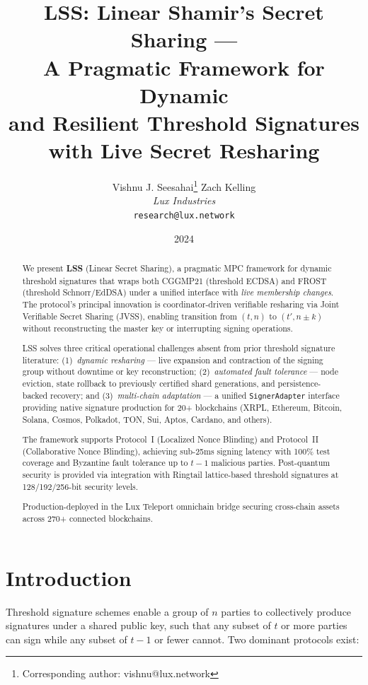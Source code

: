 \documentclass[11pt]{article}
\title{LSS: Linear Shamir's Secret Sharing ---\\A Pragmatic Framework for Dynamic\\and Resilient Threshold Signatures\\with Live Secret Resharing}
\author{
Vishnu J. Seesahai\thanks{Corresponding author: vishnu@lux.network}
\quad
Zach Kelling\\
\textit{Lux Industries}\\
\texttt{research@lux.network}
}
\date{2024}
\begin{document}
\luxcoverpage

\begin{abstract}
We present \textbf{LSS} (Linear Secret Sharing), a pragmatic MPC framework for dynamic threshold signatures that wraps both CGGMP21 (threshold ECDSA) and FROST (threshold Schnorr/EdDSA) under a unified interface with \emph{live membership changes}. The protocol's principal innovation is coordinator-driven verifiable resharing via Joint Verifiable Secret Sharing (JVSS), enabling transition from $(t, n)$ to $(t', n \pm k)$ without reconstructing the master key or interrupting signing operations.

LSS solves three critical operational challenges absent from prior threshold signature literature:
(1)~\emph{dynamic resharing} --- live expansion and contraction of the signing group without downtime or key reconstruction;
(2)~\emph{automated fault tolerance} --- node eviction, state rollback to previously certified shard generations, and persistence-backed recovery; and
(3)~\emph{multi-chain adaptation} --- a unified \texttt{SignerAdapter} interface providing native signature production for 20+ blockchains (XRPL, Ethereum, Bitcoin, Solana, Cosmos, Polkadot, TON, Sui, Aptos, Cardano, and others).

The framework supports Protocol~I (Localized Nonce Blinding) and Protocol~II (Collaborative Nonce Blinding), achieving sub-25ms signing latency with 100\% test coverage and Byzantine fault tolerance up to $t - 1$ malicious parties. Post-quantum security is provided via integration with Ringtail lattice-based threshold signatures at 128/192/256-bit security levels.

Production-deployed in the Lux Teleport omnichain bridge securing cross-chain assets across 270+ connected blockchains.
\end{abstract}

\tableofcontents

\section{Introduction}

Threshold signature schemes enable a group of $n$ parties to collectively produce signatures under a shared public key, such that any subset of $t$ or more parties can sign while any subset of $t - 1$ or fewer cannot. Two dominant protocols exist:
\end{document}
